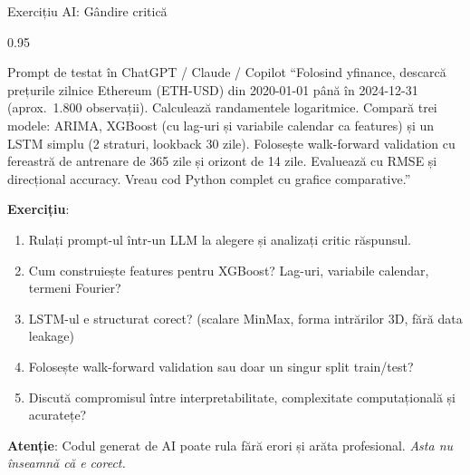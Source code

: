 \documentclass[9pt, aspectratio=169, t]{beamer}
\begin{document}
\begin{frame}{Exercițiu AI: Gândire critică}
    \begin{cminipage}{0.95\textwidth}
    \vspace{-3mm}
    \begin{block}{\footnotesize Prompt de testat în ChatGPT / Claude / Copilot}
        {\footnotesize
        ``Folosind yfinance, descarcă prețurile zilnice Ethereum (ETH-USD) din 2020-01-01 până în 2024-12-31 (aprox.\ 1.800 observații). Calculează randamentele logaritmice. Compară trei modele: ARIMA, XGBoost (cu lag-uri și variabile calendar ca features) și un LSTM simplu (2 straturi, lookback 30 zile). Folosește walk-forward validation cu fereastră de antrenare de 365 zile și orizont de 14 zile. Evaluează cu RMSE și direcțional accuracy. Vreau cod Python complet cu grafice comparative.''
        }
    \end{block}
    \vspace{-2mm}
    {\footnotesize
    \textbf{Exercițiu}:
    \begin{enumerate}\setlength{\itemsep}{0pt}
        \item Rulați prompt-ul într-un LLM la alegere și analizați critic răspunsul.
        \item Cum construiește features pentru XGBoost? Lag-uri, variabile calendar, termeni Fourier?
        \item LSTM-ul e structurat corect? (scalare MinMax, forma intrărilor 3D, fără data leakage)
        \item Folosește walk-forward validation sau doar un singur split train/test?
        \item Discută compromisul între interpretabilitate, complexitate computațională și acuratețe?
    \end{enumerate}
    }
    \vspace{-2mm}
    \begin{alertblock}{}
        {\footnotesize \textbf{Atenție}: Codul generat de AI poate rula fără erori și arăta profesional. \textit{Asta nu înseamnă că e corect.}}
    \end{alertblock}
    \end{cminipage}
\end{frame}

\end{document}

